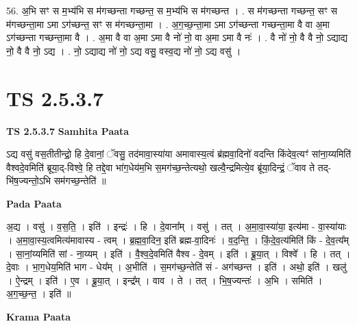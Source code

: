 \documentclass[17pt]{extarticle}
\begin{document}
56. अ॒भि सꣳ स म॒भ्य॑भि स म॑गच्छन्ता गच्छन्त॒ स म॒भ्य॑भि स म॑गच्छन्त । . स म॑गच्छन्ता गच्छन्त॒ सꣳ स म॑गच्छन्ता॒मा ऽमा ऽग॑च्छन्त॒ सꣳ स म॑गच्छन्ता॒मा । . अ॒ग॒च्छ॒न्ता॒मा ऽमा ऽग॑च्छन्ता गच्छन्ता॒मा वै वा अ॒मा ऽग॑च्छन्ता गच्छन्ता॒मा वै । . अ॒मा वै वा अ॒मा ऽमा वै नो॑ नो॒ वा अ॒मा ऽमा वै नः॑ । . वै नो॑ नो॒ वै वै नो॒ ऽद्याद्य नो॒ वै वै नो॒ ऽद्य । . नो॒ ऽद्याद्य नो॑ नो॒ ऽद्य वसु॒ वस्व॒द्य नो॑ नो॒ ऽद्य वसु॑ । \newline
\pagebreak
{}

\section{ TS 2.5.3.7 }

\textbf{TS 2.5.3.7 } \newline
\textbf{Samhita Paata} \newline

ऽद्य वसु॑ वस॒तीतीन्द्रो॒ हि दे॒वानां॒ ॅवसु॒ तद॑मावा॒स्या॑या अमावास्य॒त्वं ब्र॑ह्मवा॒दिनो॑ वदन्ति किंदेव॒त्यꣳ॑ सांना॒य्यमिति॑ वैश्वदे॒वमिति॑ ब्रूया॒द्-विश्वे॒ हि तद्दे॒वा भा॑ग॒धेय॑म॒भि स॒मग॑च्छ॒न्तेत्यथो॒ खल्वै॒न्द्रमित्ये॒व ब्रू॑या॒दिन्द्रं॒ ॅवाव ते तद्-भि॑ष॒ज्यन्तो॒ऽभि सम॑गच्छ॒न्तेति॑ ॥ \newline

\textbf{Pada Paata} \newline

अ॒द्य । वसु॑ । व॒स॒ति॒ । इति॑ । इन्द्रः॑ । हि । दे॒वाना᳚म् । वसु॑ । तत् । अ॒मा॒वा॒स्या॑या॒ इत्य॑मा - वा॒स्या॑याः । अ॒मा॒वा॒स्य॒त्वमित्य॑मावास्य - त्वम् । ब्र॒ह्म॒वा॒दिन॒ इति॑ ब्रह्म-वा॒दिनः॑ । व॒द॒न्ति॒ । किं॒दे॒व॒त्य॑मिति॑ किं - दे॒व॒त्य᳚म् । सा॒नां॒य्यमिति॑ सां - ना॒य्यम् । इति॑ । वै॒श्व॒दे॒वमिति॑ वैश्व - दे॒वम् । इति॑ । ब्रू॒या॒त् । विश्वे᳚ । हि । तत् । दे॒वाः । भा॒ग॒धेय॒मिति॑ भाग - धेय᳚म् । अ॒भीति॑ । स॒मग॑च्छ॒न्तेति॑ सं - अग॑च्छन्त । इति॑ । अथो॒ इति॑ । खलु॑ । ऐ॒न्द्रम् । इति॑ । ए॒व । ब्रू॒या॒त् । इन्द्र᳚म् । वाव । ते । तत् । भि॒ष॒ज्यन्तः॑ । अ॒भि । समिति॑ । अ॒ग॒च्छ॒न्त॒ । इति॑ ॥  \newline


\textbf{Krama Paata} \newline
\end{document}
